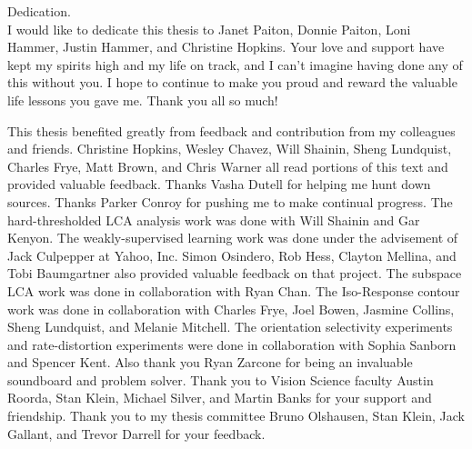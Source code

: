 \documentclass{ucbthesis}
\begin{document}
\begin{frontmatter}

\begin{dedication}
\null\vfil
\begin{center}
Dedication.\\\vspace{12pt}
I would like to dedicate this thesis to Janet Paiton, Donnie Paiton, Loni Hammer, Justin Hammer, and Christine Hopkins. Your love and support have kept my spirits high and my life on track, and I can't imagine having done any of this without you. I hope to continue to make you proud and reward the valuable life lessons you gave me. Thank you all so much!
\end{center}
\vfil\null
\end{dedication}


\tableofcontents
\clearpage
\listoffigures
\listoftables

\begin{acknowledgements}
This thesis benefited greatly from feedback and contribution from my colleagues and friends. Christine Hopkins, Wesley Chavez, Will Shainin, Sheng Lundquist, Charles Frye, Matt Brown, and Chris Warner all read portions of this text and provided valuable feedback. Thanks Vasha Dutell for helping me hunt down sources. Thanks Parker Conroy for pushing me to make continual progress. The hard-thresholded LCA analysis work was done with Will Shainin and Gar Kenyon. The weakly-supervised learning work was done under the advisement of Jack Culpepper at Yahoo, Inc. Simon Osindero, Rob Hess, Clayton Mellina, and Tobi Baumgartner also provided valuable feedback on that project. The subspace LCA work was done in collaboration with Ryan Chan. The Iso-Response contour work was done in collaboration with Charles Frye, Joel Bowen, Jasmine Collins, Sheng Lundquist, and Melanie Mitchell. The orientation selectivity experiments and rate-distortion experiments were done in collaboration with Sophia Sanborn and Spencer Kent. Also thank you Ryan Zarcone for being an invaluable soundboard and problem solver. Thank you to Vision Science faculty Austin Roorda, Stan Klein, Michael Silver, and Martin Banks for your support and friendship. Thank you to my thesis committee Bruno Olshausen, Stan Klein, Jack Gallant, and Trevor Darrell for your feedback.


\end{acknowledgements}
\end{frontmatter}
\end{document}
